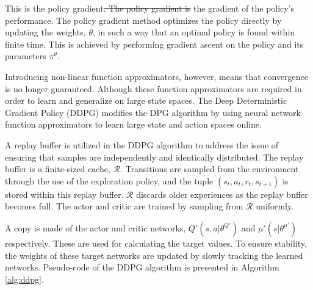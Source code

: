 \documentclass[conference]{IEEEtran}
\providecommand{\DIFadd}[1]{{\protect\color{blue}\uwave{#1}}} %
\providecommand{\DIFdel}[1]{{\protect\color{red}\sout{#1}}}                      %
\providecommand{\DIFaddbegin}{} %
\providecommand{\DIFaddend}{} %
\providecommand{\DIFdelbegin}{} %
\providecommand{\DIFdelend}{} %
\newcommand{\DIFscaledelfig}{0.5}
\newlength{\DIFdelgraphicswidth} %
\newlength{\DIFdelgraphicsheight} %
\newcommand{\DIFaddincludegraphics}[2][]{{\color{blue}\fbox{\DIFOincludegraphics[#1]{#2}}}} %
\newcommand{\DIFdelincludegraphics}[2][]{%
\sbox{\DIFdelgraphicsbox}{\DIFOincludegraphics[#1]{#2}}%
\settoboxwidth{\DIFdelgraphicswidth}{\DIFdelgraphicsbox} %
\settoboxtotalheight{\DIFdelgraphicsheight}{\DIFdelgraphicsbox} %
\scalebox{\DIFscaledelfig}{%
\parbox[b]{\DIFdelgraphicswidth}{\usebox{\DIFdelgraphicsbox}\\[-\baselineskip] \rule{\DIFdelgraphicswidth}{0em}}\llap{\resizebox{\DIFdelgraphicswidth}{\DIFdelgraphicsheight}{%
\setlength{\unitlength}{\DIFdelgraphicswidth}%
\begin{picture}(1,1)%
\thicklines\linethickness{2pt} %
{\color[rgb]{1,0,0}\put(0,0){\framebox(1,1){}}}%
{\color[rgb]{1,0,0}\put(0,0){\line( 1,1){1}}}%
{\color[rgb]{1,0,0}\put(0,1){\line(1,-1){1}}}%
\end{picture}%
}\hspace*{3pt}}} %
} %
\DeclareRobustCommand{\DIFaddbegin}{\DIFOaddbegin \let\includegraphics\DIFaddincludegraphics} %
\DeclareRobustCommand{\DIFaddend}{\DIFOaddend \let\includegraphics\DIFOincludegraphics} %
\DeclareRobustCommand{\DIFdelbegin}{\DIFOdelbegin \let\includegraphics\DIFdelincludegraphics} %
\DeclareRobustCommand{\DIFdelend}{\DIFOaddend \let\includegraphics\DIFOincludegraphics} %
\begin{document}
This is the policy gradient\DIFdelbegin \DIFdel{. The policy gradient is }\DIFdelend \DIFaddbegin \DIFadd{, }\DIFaddend the gradient of the policy's performance. The policy gradient method optimizes the policy directly by updating the weights, $\theta$, in such a way that an optimal policy is found within finite time. This is achieved by performing gradient ascent on the policy and its parameters $\pi^\theta$.

Introducing non-linear function approximators, however, means that convergence is no longer guaranteed. Although these function approximators are required in order to learn and generalize on large state spaces. The Deep Deterministic Gradient Policy (DDPG) modifies the DPG algorithm by using neural network function approximators to learn large state and action spaces online.

A replay buffer is utilized in the DDPG algorithm to address the issue of ensuring that samples are independently and identically distributed. The replay buffer is a finite-sized cache, $\mathcal{R}$. Transitions are sampled from the environment through the use of the exploration policy, and the tuple $(s_t,a_t,r_t,s_{t+1})$ is stored within this replay buffer. $\mathcal{R}$ discards older experiences as the replay buffer becomes full. The actor and critic are trained by sampling from $\mathcal{R}$ uniformly. 

A copy is made of the actor and critic networks, $Q'(s,a|\theta^{Q'})$ and $\mu'(s|\theta^{\mu'})$ respectively. These are used for calculating the target values. To ensure stability, the weights of these target networks are updated by slowly tracking the learned networks. Pseudo-code of the DDPG algorithm is presented in Algorithm \ref{alg:ddpg}.
\end{document}
